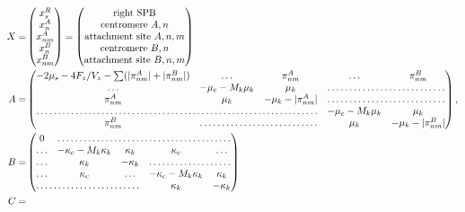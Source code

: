 \documentclass[a4paper,12pt]{article}
\begin{document}
\begin{equation}
  \begin{aligned}
    X = &%
    \begin{pmatrix}
      x_s^R\\
      x_n^A\\
      x_{nm}^A\\
      x_n^B\\
      x_{nm}^B\\
    \end{pmatrix} =%
    \begin{pmatrix}
      \text{right SPB}\\
      \text{centromere }A, n\\
      \text{attachment site }A, n,m\\
      \text{centromere }B, n\\
      \text{attachment site }B, n,m\\
    \end{pmatrix}\\
    A = &%
    \begin{pmatrix}
      - 2 \mu_s - 4 F_z/V_z - \sum (|\pi_{nm}^A| + |\pi_{nm}^B|)& \hdots & \pi_{nm}^A &%
      \hdots &  \pi_{nm}^B\\
      \hdots &  -\mu_c - M_k \mu_k& \mu_k & \hdotsfor{2}\\
      \pi_{nm}^A & \mu_k & - \mu_k - |\pi_{nm}^A| & \hdotsfor{2}\\
      \hdotsfor{3} & -\mu_c - M_k \mu_k & \mu_k\\
      \pi_{nm}^B & \hdotsfor{2} & \mu_k & - \mu_k - |\pi_{nm}^B| \\
    \end{pmatrix}, \\
    B = &%
    \begin{pmatrix}
      \,0\, & \hdotsfor{4}\\
      \hdots & - \kappa_c - M_k \kappa_k & \kappa_k &%
      \kappa_c & \hdots \\
      \hdots & \kappa_k & -\kappa_k &  \hdotsfor{2}\\
      \hdots & \kappa_c & \hdots &%
      -\kappa_c - M_k \kappa_k & \kappa_k \\
      \hdotsfor{3}  & \kappa_k & - \kappa_k\\
    \end{pmatrix}\\
    C = &%

\end{aligned}
\end{equation}
\end{document}
